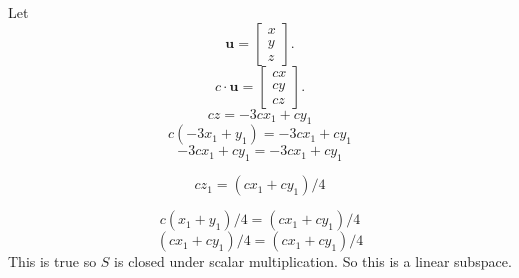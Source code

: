 \begin{enumerate}
    Let
    \[
    \mathbf{u} = 
    \begin{bmatrix} 
    x  \\ y \\ z
    \end{bmatrix}.
    \]
    \[
    c \cdot \mathbf{u} = 
    \begin{bmatrix} 
    cx  \\ cy \\ cz
    \end{bmatrix}.
    \]
    \[
    cz = -3cx_1+cy_1
    \]
     \[
    c(-3x_1+y_1) = -3cx_1+cy_1
    \]
     \[
    -3cx_1+cy_1 = -3cx_1+cy_1
    \]

    \[
    cz_1 = (cx_1 +cy_1)/4
    \]

     \[
    c(x_1+y_1)/4 = (cx_1 +cy_1)/4
    \]
     \[
     (cx_1+cy_1)/4 = (cx_1 +cy_1)/4
    \]
     This is true so \( S \) is closed under scalar multiplication.
     So this is a linear subspace.
\end{enumerate}